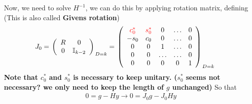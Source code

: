 Now, we need to solve $H^{-1}$, we can do this by applying rotation matrix, defining (This is also called \textbf{Givens rotation})
\begin{equation}
\begin{split}
&J_0=
{\left.\left(\begin{array}{cc}
 R & 0 \\
0 & \mathbb{I}_{k-2} \\
\end{array}\right)\right. }_{D=k}
={\left.\left(\begin{array}{ccccc}
\textcolor[rgb]{1,0,0}{c_0^*} & \textcolor[rgb]{1,0,0}{s_0^*} & 0 & \ldots & 0 \\
-s_0 & c_0 & 0 & \ldots & 0 \\
0 & 0 & 1 & \ldots & 0 \\
0 & 0 & \ldots & \ldots & 0 \\
0 & 0 & 0 & 0 & 1 \\
\end{array}\right)\right. }_{D=k}
\end{split}
\end{equation}
\textbf{Note that $c_0^*$ and $s_0^*$ is necessary to keep unitary. ($s_0^*$ seems not necessary? we only need to keep the length of $g$ unchanged)} So that
\begin{equation}
\begin{split}
&0=g-Hy\to 0=J_0g-J_0Hy\\
\end{split}
\end{equation}

